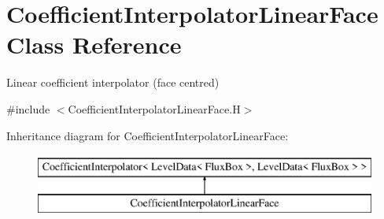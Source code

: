 \hypertarget{class_coefficient_interpolator_linear_face}{\section{Coefficient\-Interpolator\-Linear\-Face Class Reference}
\label{class_coefficient_interpolator_linear_face}
}


Linear coefficient interpolator (face centred)  




{\ttfamily \#include $<$Coefficient\-Interpolator\-Linear\-Face.\-H$>$}

Inheritance diagram for Coefficient\-Interpolator\-Linear\-Face\-:\begin{figure}[H]
\begin{center}
\leavevmode
\includegraphics[height=2.000000cm]{class_coefficient_interpolator_linear_face}
\end{center}
\end{figure}

